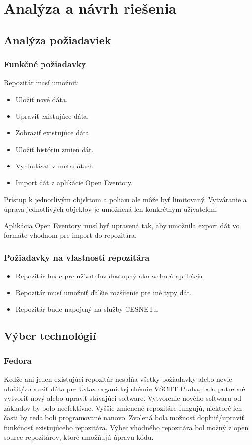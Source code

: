 \documentclass[thesis=M,slovak]{FITthesis}[2013/05/06]
\begin{document}
\chapter{Analýza a návrh riešenia}
\section{Analýza požiadaviek}
\subsection{Funkčné požiadavky}
Repozitár musí umožniť:
\begin{itemize}
	\item Uložiť nové dáta.
	\item Upraviť existujúce dáta.
	\item Zobraziť existujúce dáta.
	\item Uložiť históriu zmien dát.
	\item Vyhľadávať v metadátach.
	\item Import dát z aplikácie Open Eventory.
\end{itemize}

Prístup k jednotlivým objektom a poliam ale môže byť limitovaný. Vytváranie a úprava jednotlivých objektov je umožnená len konkrétnym užívateľom.

Aplikácia Open Eventory musí byť upravená tak, aby umožnila export dát vo formáte vhodnom pre import do repozitára.

\subsection{Požiadavky na vlastnosti repozitára}
\begin{itemize}
	\item Repozitár bude pre užívateľov dostupný ako webová aplikácia.
	\item Repozitár musí umožniť ďalšie rozšírenie pre iné typy dát.
	\item Repozitár bude napojený na služby CESNETu.
\end{itemize}

\section{Výber technológií}
\subsection{Fedora}
Keďže ani jeden existujúci repozitár nespĺňa všetky požiadavky alebo nevie uložiť/zobraziť dáta pre Ústav organickej chémie VŠCHT Praha, bolo potrebné vytvoriť nový alebo upraviť stávajúci software. Vytvorenie nového softwaru od základov by bolo neefektívne. Vyššie zmienené repozitáre fungujú, niektoré ich časti by teda boli programované nanovo. Zvolená bola možnosť doplniť/upraviť funkčnosť existujúceho repozitára. Výber vhodného repozitára bol možný z open source repozitárov, ktoré umožňujú úpravu kódu.
\end{document}
